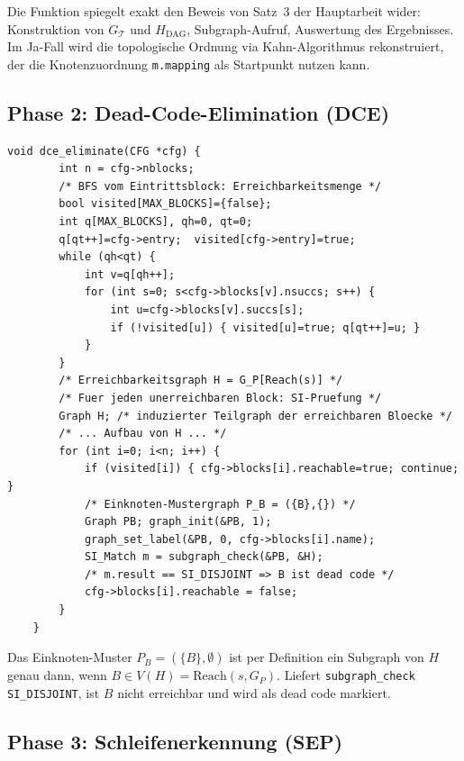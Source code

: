 ﻿\documentclass[a4paper,12pt]{article}
\theoremstyle{definition}
\begin{document}
Die Funktion spiegelt exakt den Beweis von Satz~3 der Hauptarbeit wider:
Konstruktion von $G_{\mathcal{T}}$ und $H_{\text{DAG}}$, Subgraph-Aufruf,
Auswertung des Ergebnisses. Im Ja-Fall wird die topologische Ordnung via
Kahn-Algorithmus rekonstruiert, der die Knotenzuordnung \texttt{m.mapping}
als Startpunkt nutzen kann.

\subsection{Phase 2: Dead-Code-Elimination (DCE)}
\label{sec:impl-dce}

\begin{lstlisting}[style=cstyle, caption={DCE -- MusterprÃ¼fung per SI
		(compiler\_full.c)}, label=lst:dce-impl]
	void dce_eliminate(CFG *cfg) {
		int n = cfg->nblocks;
		/* BFS vom Eintrittsblock: Erreichbarkeitsmenge */
		bool visited[MAX_BLOCKS]={false};
		int q[MAX_BLOCKS], qh=0, qt=0;
		q[qt++]=cfg->entry;  visited[cfg->entry]=true;
		while (qh<qt) {
			int v=q[qh++];
			for (int s=0; s<cfg->blocks[v].nsuccs; s++) {
				int u=cfg->blocks[v].succs[s];
				if (!visited[u]) { visited[u]=true; q[qt++]=u; }
			}
		}
		/* Erreichbarkeitsgraph H = G_P[Reach(s)] */
		/* Fuer jeden unerreichbaren Block: SI-Pruefung */
		Graph H; /* induzierter Teilgraph der erreichbaren Bloecke */
		/* ... Aufbau von H ... */
		for (int i=0; i<n; i++) {
			if (visited[i]) { cfg->blocks[i].reachable=true; continue; }
			/* Einknoten-Mustergraph P_B = ({B},{}) */
			Graph PB; graph_init(&PB, 1);
			graph_set_label(&PB, 0, cfg->blocks[i].name);
			SI_Match m = subgraph_check(&PB, &H);
			/* m.result == SI_DISJOINT => B ist dead code */
			cfg->blocks[i].reachable = false;
		}
	}
\end{lstlisting}

Das Einknoten-Muster $P_B = (\{B\}, \emptyset)$ ist per Definition ein
Subgraph von $H$ genau dann, wenn $B \in V(H) = \mathrm{Reach}(s, G_P)$.
Liefert \texttt{subgraph\_check} \texttt{SI\_DISJOINT}, ist $B$ nicht
erreichbar und wird als dead code markiert.

\subsection{Phase 3: Schleifenerkennung (SEP)}
\label{sec:impl-sep}
\end{document}
